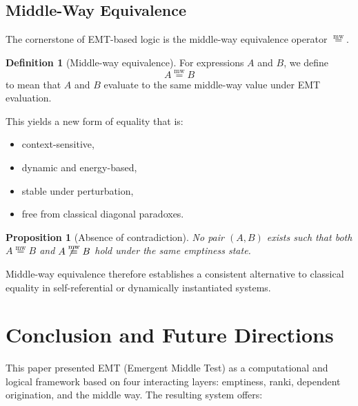 \documentclass[11pt]{article}
\newcommand{\mweq}{\mathrel{\overset{\mathrm{mw}}{=}}}
\newtheorem{proposition}[theorem]{Proposition}
\theoremstyle{definition}
\newtheorem{definition}[theorem]{Definition}
\theoremstyle{remark}
\begin{document}

\subsection{Middle-Way Equivalence}

The cornerstone of EMT-based logic is the middle-way equivalence
operator $\mweq$.

\begin{definition}[Middle-way equivalence]
For expressions $A$ and $B$, we define
\[
   A \mweq B
\]
to mean that $A$ and $B$ evaluate to the same middle-way value under
EMT evaluation.
\end{definition}

This yields a new form of equality that is:

\begin{itemize}
  \item context-sensitive,
  \item dynamic and energy-based,
  \item stable under perturbation,
  \item free from classical diagonal paradoxes.
\end{itemize}

\begin{proposition}[Absence of contradiction]
No pair $(A,B)$ exists such that both $A \mweq B$ and
$A \not\mweq B$ hold under the same emptiness state.
\end{proposition}

Middle-way equivalence therefore establishes a consistent alternative
to classical equality in self-referential or dynamically instantiated
systems.


\section{Conclusion and Future Directions}

This paper presented EMT (Emergent Middle Test) as a computational and
logical framework based on four interacting layers:
emptiness, ranki, dependent origination, and the middle way.
The resulting system offers:
\end{document}
